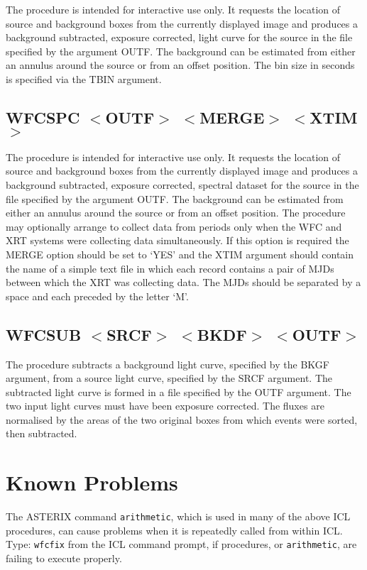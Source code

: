 The procedure is intended for interactive use only. It requests the
location of source and background boxes from the currently displayed
image and produces a background subtracted, exposure corrected, light
curve for the source in the file specified by the argument OUTF. The
background can be estimated from either an annulus around the source or
from an offset position. The bin size in seconds is specified via the 
TBIN argument.

\subsection{WFCSPC $<$OUTF$>$ $<$MERGE$>$ $<$XTIM$>$}
\label{sec:procedures:wfcspc}

The procedure is intended for interactive use only. It requests the
location of source and background boxes from the currently displayed
image and produces a background subtracted, exposure corrected,
spectral dataset for the source in the file specified by the argument
OUTF.  The background can be estimated from either an annulus around
the source or from an offset position. The procedure may optionally
arrange to collect data from periods only when the WFC and XRT systems
were collecting data simultaneously. If this option is required the
MERGE option should be set to `YES' and the XTIM argument should
contain the name of a simple text file in which each record contains a
pair of MJDs between which the XRT was collecting data. The MJDs should
be separated by a space and each preceded by the letter `M'.

\subsection{WFCSUB $<$SRCF$>$ $<$BKDF$>$ $<$OUTF$>$}
\label{sec:procedures:wfcsub}

The procedure subtracts a background light curve, specified by the
BKGF argument, from a source light curve, specified by the SRCF
argument. The subtracted light curve is formed in a file specified
by the OUTF argument. The two input light curves must have been
exposure corrected. The fluxes are normalised by the areas of the
two original boxes from which events were sorted, then subtracted.

\section{Known Problems}
\label{sec:problems}

The ASTERIX command {\tt arithmetic}, which is used in many of the
above ICL procedures, can cause problems when it is repeatedly called
from within ICL.  Type: {\tt wfcfix} from the ICL command prompt, if
procedures, or {\tt arithmetic}, are failing to execute properly.


